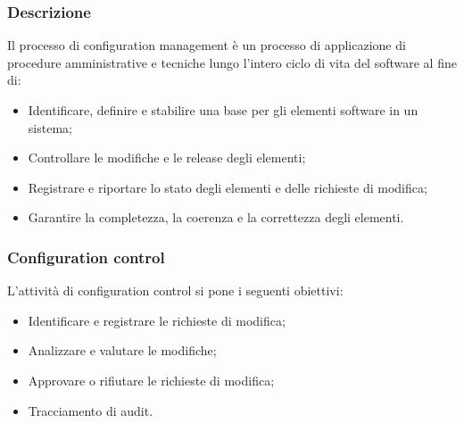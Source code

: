 \documentclass[10pt, a4paper]{article}
\begin{document}
\subsubsection{Descrizione}
Il processo di configuration management è un processo di applicazione di procedure amministrative e tecniche lungo l'intero ciclo di vita del software al fine di:
\begin{itemize}
    \item Identificare, definire e stabilire una base per gli elementi software in un sistema;
    \item Controllare le modifiche e le release degli elementi;
    \item Registrare e riportare lo stato degli elementi e delle richieste di modifica;
    \item Garantire la completezza, la coerenza e la correttezza degli elementi.
\end{itemize}

\subsubsection{Configuration control}
L'attività di configuration control si pone i seguenti obiettivi:
\begin{itemize}
    \item Identificare e registrare le richieste di modifica;
    \item Analizzare e valutare le modifiche;
    \item Approvare o rifiutare le richieste di modifica;
    \item Tracciamento di audit.
\end{itemize}
\end{document}
